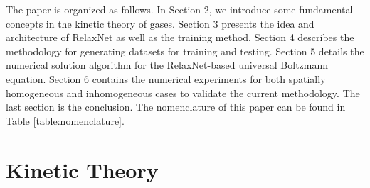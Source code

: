 \documentclass[preprint,3p,12pt,sort&compress]{elsarticle}
\begin{document}
The paper is organized as follows.
In Section 2, we introduce some fundamental concepts in the kinetic theory of gases.
Section 3 presents the idea and architecture of RelaxNet as well as the training method.
Section 4 describes the methodology for generating datasets for training and testing.
Section 5 details the numerical solution algorithm for the RelaxNet-based universal Boltzmann equation.
Section 6 contains the numerical experiments for both spatially homogeneous and inhomogeneous cases to validate the current methodology. 
The last section is the conclusion.
The nomenclature of this paper can be found in Table \ref{table:nomenclature}.

\section{Kinetic Theory}\label{sec:theory}
\end{document}
